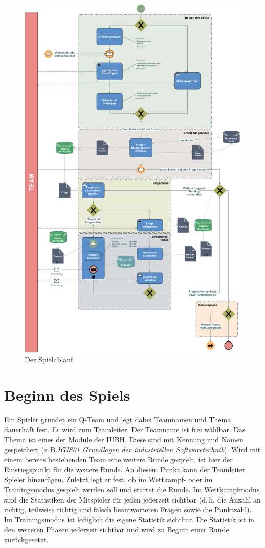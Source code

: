 \documentclass[a4paper,11pt,listof=numbered,glossary=totoc,parskip=half,toc=bib]{scrreprt}
\newcommand{\zB}{\mbox{z.\,B.}\xspace}
\newcommand{\dash}{\mbox{d.\,h.}\xspace}
\begin{document}
	\begin{figure}
		\centering
		\includegraphics[width=\textwidth]{bpmn_IST.png}
		\caption{Der Spielablauf}
		\label{fig:bpmn}
	\end{figure}
	
	\section{Beginn des Spiels}
	Ein Spieler gründet ein Q-Team und legt dabei Teamnamen und Thema dauerhaft fest. Er wird zum Teamleiter. Der Teamname ist frei wählbar. Das Thema ist eines der Module der IUBH. Diese sind mit Kennung und Namen gespeichert (\zB \textit{IGIS01 Grundlagen der industriellen Softwaretechnik}). 
	Wird mit einem bereits bestehenden Team eine weitere Runde gespielt, ist hier der Einstiegspunkt für die weitere Runde.
	An diesem Punkt kann der Teamleiter Spieler hinzufügen.
	Zuletzt legt er fest, ob im Wettkampf- oder im Trainingsmodus gespielt werden soll und startet die Runde.
	Im Wettkampfmodus sind die Statistiken der Mitspieler für jeden jederzeit sichtbar (\dash die Anzahl an richtig, teilweise richtig und falsch beantworteten Fragen sowie die Punktzahl). Im Trainingsmodus ist lediglich die eigene Statistik sichtbar. Die Statistik ist in den weiteren Phasen jederzeit sichtbar und wird zu Beginn einer Runde zurückgesetzt.
	
\end{document}
